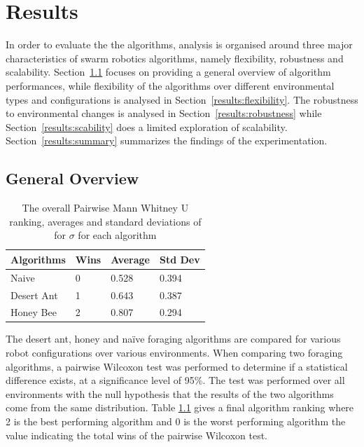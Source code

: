 \chapter{Results}
\label{chap:results}

In order to evaluate the the algorithms, analysis is organised around three major characteristics of swarm robotics algorithms, namely flexibility, robustness and scalability. Section~\ref{overview} focuses on providing a general overview of algorithm performances, while flexibility of the algorithms over different environmental types and configurations is analysed in Section~\ref{results:flexibility}. The robustness to environmental changes is analysed in Section~\ref{results:robustness} while Section~\ref{results:scability} does a limited exploration of scalability. Section~\ref{results:summary} summarizes the findings of the experimentation. 

\section{General Overview}
\label{overview}

\begin{table}
\centering
    \caption{The overall Pairwise Mann Whitney U ranking, averages and standard deviations of for $\sigma$ for each algorithm}
        \label{summarytable}
    \begin{tabular}{l|lll}
    \hline \hline
    Algorithms & Wins & Average & Std Dev \\ \hline
    Naive      & 0    & 0.528   & 0.394  \\
    Desert Ant  & 1    & 0.643   & 0.387  \\
    Honey Bee   & 2    & 0.807   & 0.294  \\

    \hline
    \end{tabular}
\end{table}

The desert ant, honey and na\"ive foraging algorithms are compared for various robot configurations over various environments. When comparing two foraging algorithms, a pairwise Wilcoxon test was performed to determine if a statistical difference exists, at a significance level of 95\%. The test was performed over all environments with the null  hypothesis that the results of the two algorithms come from the same distribution. Table \ref{summarytable} gives a final algorithm ranking where 2 is the best performing algorithm and 0 is the worst performing algorithm the value indicating the total wins of the pairwise Wilcoxon test.

